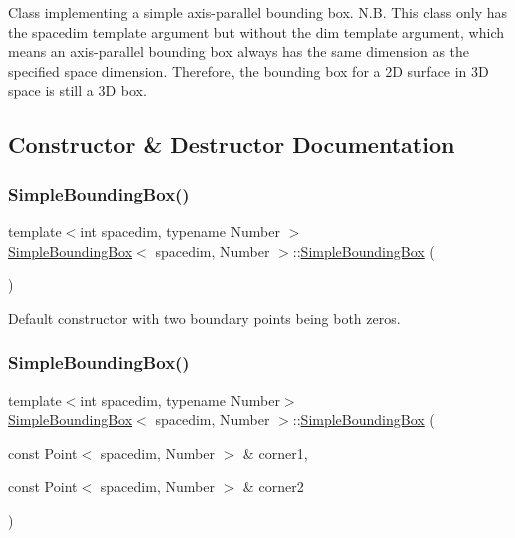 Class implementing a simple axis-\/parallel bounding box. N.\+B. This class only has the {\ttfamily spacedim} template argument but without the {\ttfamily dim} template argument, which means an axis-\/parallel bounding box always has the same dimension as the specified space dimension. Therefore, the bounding box for a 2D surface in 3D space is still a 3D box. 

\subsection{Constructor \& Destructor Documentation}
\mbox{\label{classSimpleBoundingBox_a6975b3ff39148250f0b4dfdd90194653}} 
\subsubsection{\texorpdfstring{Simple\+Bounding\+Box()}{SimpleBoundingBox()}\hspace{0.1cm}{\footnotesize\ttfamily [1/7]}}
{\footnotesize\ttfamily template$<$int spacedim, typename Number $>$ \\
\hyperlink{classSimpleBoundingBox}{Simple\+Bounding\+Box}$<$ spacedim, Number $>$\+::\hyperlink{classSimpleBoundingBox}{Simple\+Bounding\+Box} (\begin{DoxyParamCaption}{ }\end{DoxyParamCaption})}

Default constructor with two boundary points being both zeros. \mbox{\label{classSimpleBoundingBox_a2ef944074a061d1813d46edb437706df}} 
\subsubsection{\texorpdfstring{Simple\+Bounding\+Box()}{SimpleBoundingBox()}\hspace{0.1cm}{\footnotesize\ttfamily [2/7]}}
{\footnotesize\ttfamily template$<$int spacedim, typename Number$>$ \\
\hyperlink{classSimpleBoundingBox}{Simple\+Bounding\+Box}$<$ spacedim, Number $>$\+::\hyperlink{classSimpleBoundingBox}{Simple\+Bounding\+Box} (\begin{DoxyParamCaption}\item[{const Point$<$ spacedim, Number $>$ \&}]{corner1,  }\item[{const Point$<$ spacedim, Number $>$ \&}]{corner2 }\end{DoxyParamCaption})}

